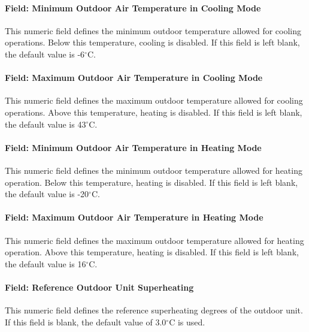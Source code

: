 \paragraph{Field: Minimum Outdoor Air Temperature in Cooling Mode}\label{field-minimum-outdoor-air-temperature-in-cooling-mode}

This numeric field defines the minimum outdoor temperature allowed for cooling operations. Below this temperature, cooling is disabled. If this field is left blank, the default value is -6$^\circ$C.

\paragraph{Field: Maximum Outdoor Air Temperature in Cooling Mode}\label{field-maximum-outdoor-air-temperature-in-cooling-mode}

This numeric field defines the maximum outdoor temperature allowed for cooling operations. Above this temperature, heating is disabled. If this field is left blank, the default value is 43$^\circ$C.

\paragraph{Field: Minimum Outdoor Air Temperature in Heating Mode}\label{field-minimum-outdoor-air-temperature-in-heating-mode}

This numeric field defines the minimum outdoor temperature allowed for heating operation. Below this temperature, heating is disabled. If this field is left blank, the default value is -20$^\circ$C.

\paragraph{Field: Maximum Outdoor Air Temperature in Heating Mode}\label{field-maximum-outdoor-air-temperature-in-heating-mode}

This numeric field defines the maximum outdoor temperature allowed for heating operation. Above this temperature, heating is disabled. If this field is left blank, the default value is 16$^\circ$C.

\paragraph{Field: Reference Outdoor Unit Superheating}\label{field-outdoor-unit-reference-superheating}

This numeric field defines the reference superheating degrees of the outdoor unit. If this field is blank, the default value of 3.0$^\circ$C is used.

